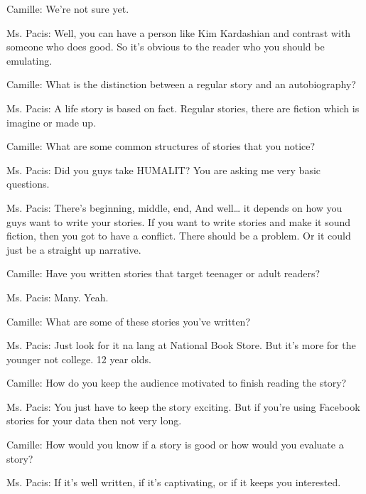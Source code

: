 Camille: We're not sure yet.
 
Ms. Pacis: Well, you can have a person like Kim Kardashian and contrast with someone who does good. So it's obvious to the reader who you should be emulating.
 
Camille: What is the distinction between a regular story and an autobiography?
 
Ms. Pacis: A life story is based on fact. Regular stories, there are fiction which is imagine or made up.
 
Camille: What are some common structures of stories that you notice?

Ms. Pacis: Did you guys take HUMALIT? You are asking me very basic questions. 

Ms. Pacis: There's beginning, middle, end, And well… it depends on how you guys want to write your stories. If you want to write stories and make it sound fiction, then you got to have a conflict. There should be a problem. Or it could just be a straight up narrative.
 
Camille: Have you written stories that target teenager or adult readers?
 
Ms. Pacis: Many. Yeah.
 
Camille: What are some of these stories you've written?
 
Ms. Pacis: Just look for it na lang at National Book Store. But it’s more for the younger not college. 12 year olds.
 
Camille: How do you keep the audience motivated to finish reading the story?
 
Ms. Pacis: You just have to keep the story exciting. But if you're using Facebook stories for your data then not very long.
 
Camille: How would you know if a story is good or how would you evaluate a story?
 
Ms. Pacis: If it's well written, if it’s captivating, or if it keeps you interested. 